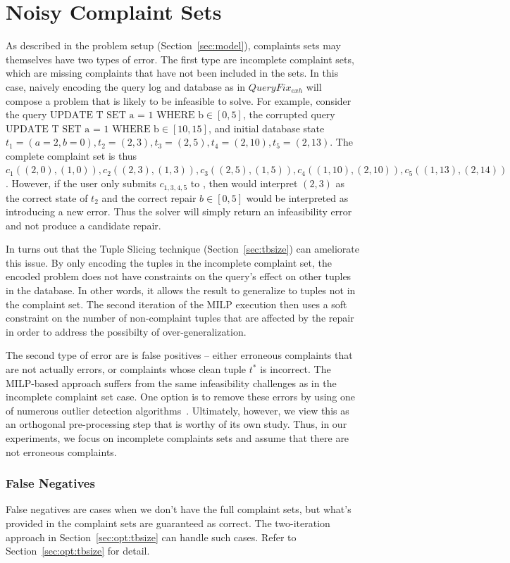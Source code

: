 \section{Noisy Complaint Sets}
\label{sec:noise}

As described in the problem setup (Section~\ref{sec:model}),
complaints sets may themselves have two types of error.
The first type are incomplete complaint sets, which are missing complaints
that have not been included in the sets.
In this case, naively encoding the query log and database as in $QueryFix_{exh}$
will compose a problem that is likely to be infeasible to solve.  
For example, consider the query $\textrm{UPDATE T SET a = 1 WHERE b} \in [0,5]$,
the corrupted query $\textrm{UPDATE T SET a = 1 WHERE b} \in [10,15]$,
and initial database state $t_1=(a=2, b=0), t_2=(2, 3), t_3=(2, 5), t_4=(2, 10), t_5=(2, 13)$.
The complete complaint set is thus $c_1((2,0), (1,0)), c_2((2,3), (1,3)), c_3((2,5), (1,5)), c_4((1,10), (2,10)), c_5((1,13), (2,14))$.
However, if the user only submits $c_{1,3,4,5}$ to \sys, then \sys would interpret $(2,3)$
as the correct state of $t_2$ and the correct repair $b \in [0, 5]$ would 
be interpreted as introducing a new error.   Thus the solver will simply return
an infeasibility error and not produce a candidate repair.

In turns out that the Tuple Slicing technique (Section~\ref{sec:tbsize})
can ameliorate this issue.  By only encoding the tuples in the incomplete complaint set,
the encoded problem does not have constraints on the query's effect on other tuples in the database.
In other words, it allows the result to generalize to tuples not in the complaint set.
The second iteration of the MILP execution then uses a soft constraint on the number of
non-complaint tuples that are affected by the repair in order to address the possibilty of over-generalization.

The second type of error are is false positives -- either erroneous complaints that are 
not actually errors, or complaints whose clean tuple $t^*$ is incorrect.
The MILP-based approach suffers from the same infeasibility challenges as in the incomplete complaint set case.
One option is to remove these errors by using one of numerous outlier detection algorithms~\cite{}.
Ultimately, however, we view this as an orthogonal pre-processing step that is worthy of its own study.
Thus, in our experiments, we focus on incomplete complaints sets and assume that
there are not erroneous complaints.


  \subsubsection{False Negatives}
  False negatives are cases when we don't have the full complaint sets, but
  what's provided in the complaint sets are guaranteed as correct. The 
  two-iteration approach in Section~\ref{sec:opt:tbsize} can handle 
  such cases. Refer to Section~\ref{sec:opt:tbsize} for detail.



